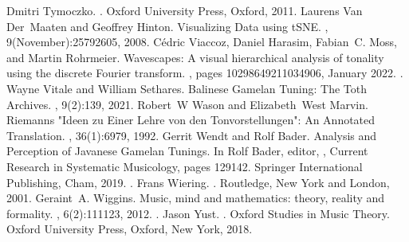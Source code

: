 \documentclass[letterpaper,10pt,english]{sphinxmanual}
\begin{document}
\begin{sphinxthebibliography}{10}
\sphinxAtStartPar
Dmitri Tymoczko. . Oxford University Press, Oxford, 2011.
\sphinxAtStartPar
Laurens Van Der Maaten and Geoffrey Hinton. Visualizing Data using t\sphinxhyphen{}SNE. , 9(November):2579\textendash{}2605, 2008.
\sphinxAtStartPar
Cédric Viaccoz, Daniel Harasim, Fabian C. Moss, and Martin Rohrmeier. Wavescapes: A visual hierarchical analysis of tonality using the discrete Fourier transform. , pages 10298649211034906, January 2022. .
\sphinxAtStartPar
Wayne Vitale and William Sethares. Balinese Gamelan Tuning: The Toth Archives. , 9(2):1\textendash{}39, 2021.
\sphinxAtStartPar
Robert W Wason and Elizabeth West Marvin. Riemann\textquotesingle{}s "Ideen zu Einer \textquotesingle{}Lehre von den Tonvorstellungen\textquotesingle{}": An Annotated Translation. , 36(1):69\textendash{}79, 1992.
\sphinxAtStartPar
Gerrit Wendt and Rolf Bader. Analysis and Perception of Javanese Gamelan Tunings. In Rolf Bader, editor, , Current Research in Systematic Musicology, pages 129\textendash{}142. Springer International Publishing, Cham, 2019. .
\sphinxAtStartPar
Frans Wiering. . Routledge, New York and London, 2001.
\sphinxAtStartPar
Geraint A. Wiggins. Music, mind and mathematics: theory, reality and formality. , 6(2):111\textendash{}123, 2012. .
\sphinxAtStartPar
Jason Yust. . Oxford Studies in Music Theory. Oxford University Press, Oxford, New York, 2018.
\end{sphinxthebibliography}


\renewcommand{\indexname}{Python Module Index}
\begin{sphinxtheindex}
\let\bigletter\sphinxstyleindexlettergroup
\bigletter{g}
\item\relax{}
\end{sphinxtheindex}

\renewcommand{\indexname}{Index}
\printindex
\end{document}
